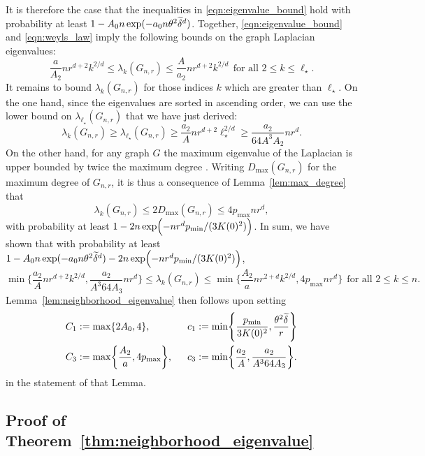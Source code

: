 It is therefore the case that the inequalities in \eqref{eqn:eigenvalue_bound} hold with probability at least $1 - A_0n\exp(-a_0n\theta^2\widetilde{\delta}^{d})$. Together, \eqref{eqn:eigenvalue_bound} and \eqref{eqn:weyls_law} imply the following bounds on the graph Laplacian eigenvalues:
\begin{equation*}
\frac{a}{A_2} nr^{d + 2} k^{2/d} \leq \lambda_k(G_{n,r}) \leq \frac{A}{a_2} nr^{d + 2} k^{2/d}~~\textrm{for all $2 \leq k \leq \ell_{\star}$}.
\end{equation*}
It remains to bound $\lambda_k(G_{n,r})$ for those indices $k$ which are greater than $\ell_{\star}$. On the one hand, since the eigenvalues are sorted in ascending order, we can use the lower bound on $\lambda_{\ell_{\star}}(G_{n,r})$ that we have just derived:
\begin{equation*}
\lambda_k(G_{n,r}) \geq \lambda_{\ell_{\star}}(G_{n,r}) \geq \frac{a_2}{A}nr^{d + 2}\ell_{\star}^{2/d} \geq \frac{a_2}{64A^3 A_2} nr^{d}.
\end{equation*}
On the other hand, for any graph $G$ the maximum eigenvalue of the Laplacian is upper bounded by twice the maximum degree \citep{chung97}. Writing $D_{\max}(G_{n,r})$ for the maximum degree of $G_{n,r}$, it is thus a consequence of Lemma~\ref{lem:max_degree} that
\begin{equation*}
\lambda_k(G_{n,r}) \leq 2D_{\max}(G_{n,r}) \leq 4p_{\max}nr^d,
\end{equation*}
with probability at least $1 - 2n\exp\Bigl(-nr^dp_{\min}/(3K(0)^2)\Bigr)$. In sum, we have shown that with probability at least $1 - A_0n\exp(-a_0n\theta^2\widetilde{\delta}^{d}) - 2n\exp\Bigl(-nr^dp_{\min}/(3K(0)^2)\Bigr)$,
\begin{equation*}
\min\biggl\{\frac{a_2}{A}nr^{d + 2}k^{2/d}, \frac{a_2}{A^3 64 A_3} nr^d\biggr\} \leq \lambda_k(G_{n,r}) \leq \min\biggl\{\frac{A_2}{a}nr^{2 + d}k^{2/d}, 4p_{\max}nr^d\biggr\}~~\textrm{for all $2 \leq k \leq n$.}
\end{equation*}
Lemma~\ref{lem:neighborhood_eigenvalue} then follows upon setting
\begin{align*}
C_1 & := \max\{2A_0,4\},~~ && c_1 := \min\Biggl\{\frac{p_{\min}}{3K(0)^2}, \frac{\theta^2\widetilde{\delta}}{r}\Biggr\} \\
C_3 & := \max\biggl\{\frac{A_2}{a}, 4p_{\max}\biggr\},~~ && c_3 := \min\biggl\{\frac{a_2}{A}, \frac{a_2}{A^3 64 A_3} \biggr\}.
\end{align*}
in the statement of that Lemma.

\subsection{Proof of Theorem~\ref{thm:neighborhood_eigenvalue}}
\label{subsec:neighbrhood_eigenvalue_pf}

